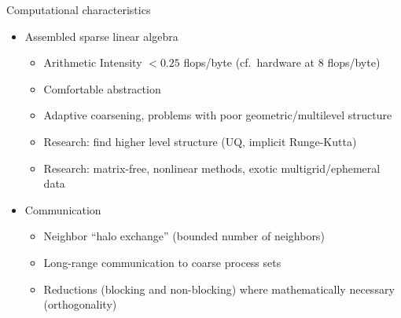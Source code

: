 \documentclass{beamer}
\begin{document}
\begin{frame}{Computational characteristics}
  \begin{itemize}
  \item Assembled sparse linear algebra
    \begin{itemize}
    \item Arithmetic Intensity $< 0.25$ flops/byte (cf.~hardware at 8 flops/byte)
    \item Comfortable abstraction
    \item Adaptive coarsening, problems with poor geometric/multilevel structure
    \item Research: find higher level structure (UQ, implicit Runge-Kutta)
    \item Research: matrix-free, nonlinear methods, exotic multigrid/ephemeral data
    \end{itemize}
  \item Communication
    \begin{itemize}
    \item Neighbor ``halo exchange'' (bounded number of neighbors)
    \item Long-range communication to coarse process sets
    \item Reductions (blocking and non-blocking) where mathematically necessary (orthogonality)
    \end{itemize}
  \end{itemize}
\end{frame}
\end{document}
